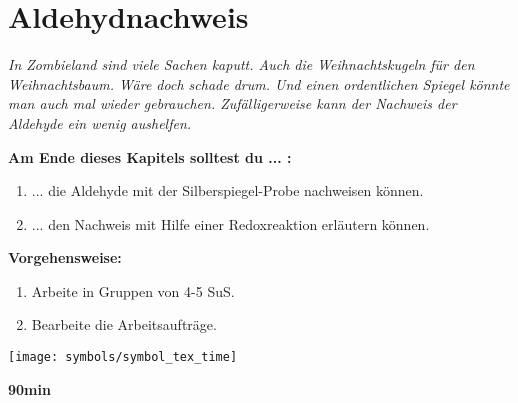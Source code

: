 \documentclass{scrartcl}  %
\begin{document}
	

\newpage



		\section{Aldehydnachweis}
			\textit{In Zombieland sind viele Sachen kaputt. Auch die Weihnachtskugeln für den Weihnachtsbaum. Wäre doch schade drum. Und einen ordentlichen Spiegel könnte man auch mal wieder gebrauchen. Zufälligerweise kann der Nachweis der Aldehyde ein wenig aushelfen.}
			
			\begin{minipage}{0.7\textwidth}
				\noindent \textbf{Am Ende dieses Kapitels solltest du ... :}
				\begin{enumerate}
					\item ... die Aldehyde mit der Silberspiegel-Probe nachweisen können.
					\item ... den Nachweis mit Hilfe einer Redoxreaktion erläutern können. 
				\end{enumerate}	
				
				\noindent \textbf{Vorgehensweise:}
				\begin{enumerate}
					\item Arbeite in Gruppen von 4-5 SuS.
					\item Bearbeite die Arbeitsaufträge.
				\end{enumerate}	
			\end{minipage}
			\hspace{0.1\textwidth}
			\begin{minipage}{0.2\textwidth}
				\begin{tcolorbox}
					[enhanced,
					width=0.9\textwidth,
					colback=white,
					colframe=black,
					fonttitle=\sffamily\bfseries\large, 
					title=Zeit,  %
					attach boxed title to top center={xshift=-0.0mm,yshift=-0.50mm},
					boxed title style={skin=enhancedfirst jigsaw,size=small,arc=1mm,bottom=-1mm,colframe=black,height=0.75cm},
					colbacktitle=black,
					drop lifted shadow]
					\centering
					\texttt{[image: symbols/symbol\_tex\_time]}
					
					\begin{center}
						\textbf{90min}
					\end{center}
				\end{tcolorbox}
			\end{minipage}
			
\end{document}
